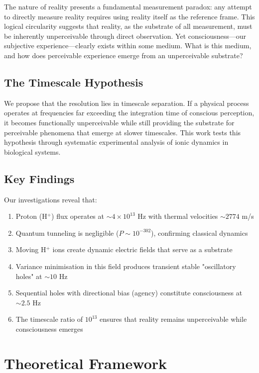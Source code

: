 \documentclass[12pt,a4paper]{article}
\begin{document}
The nature of reality presents a fundamental measurement paradox: any attempt to directly measure reality requires using reality itself as the reference frame. This logical circularity suggests that reality, as the substrate of all measurement, must be inherently unperceivable through direct observation. Yet consciousness—our subjective experience—clearly exists within some medium. What is this medium, and how does perceivable experience emerge from an unperceivable substrate?

\subsection{The Timescale Hypothesis}

We propose that the resolution lies in timescale separation. If a physical process operates at frequencies far exceeding the integration time of conscious perception, it becomes functionally unperceivable while still providing the substrate for perceivable phenomena that emerge at slower timescales. This work tests this hypothesis through systematic experimental analysis of ionic dynamics in biological systems.

\subsection{Key Findings}

Our investigations reveal that:
\begin{enumerate}
\item Proton (H$^+$) flux operates at $\sim 4 \times 10^{13}$ Hz with thermal velocities $\sim 2774$ m/s
\item Quantum tunneling is negligible ($P \sim 10^{-302}$), confirming classical dynamics
\item Moving H$^+$ ions create dynamic electric fields that serve as a substrate
\item Variance minimisation in this field produces transient stable "oscillatory holes" at $\sim 10$ Hz
\item Sequential holes with directional bias (agency) constitute consciousness at $\sim 2.5$ Hz
\item The timescale ratio of $10^{13}$ ensures that reality remains unperceivable while consciousness emerges
\end{enumerate}

\section{Theoretical Framework}
\end{document}
